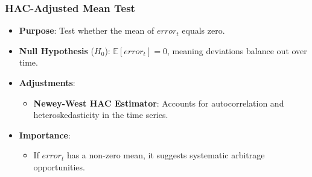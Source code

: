 \documentclass[12pt]{article}
\begin{document}
\subsubsection {HAC-Adjusted Mean Test}

\begin{itemize}
    \item \textbf{Purpose}: Test whether the mean of $error_t$ equals zero.
    \item \textbf{Null Hypothesis} ($H_0$): $\mathbb{E}[error_t] = 0$, meaning deviations balance out over time.
    \item \textbf{Adjustments}:
    \begin{itemize}
        \item \textbf{Newey-West HAC Estimator}: Accounts for autocorrelation and heteroskedasticity in the time series.
    \end{itemize}
    \item \textbf{Importance}:
    \begin{itemize}
        \item If $error_t$ has a non-zero mean, it suggests systematic arbitrage opportunities.
    \end{itemize}
\end{itemize}
\end{document}
